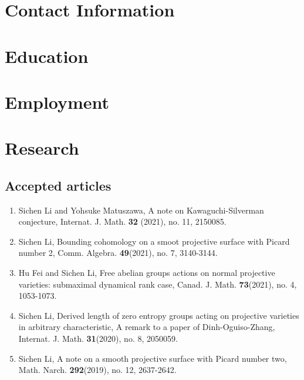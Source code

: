 \documentclass{resume}
\begin{document}

\section{\bf Contact Information}
\section{\bf Education}
\section{\bf Employment}
\section{\bf Research}
\subsection{\bf Accepted articles}
\begin{enumerate}
\item  Sichen Li and  Yohsuke Matuszawa, A note on Kawaguchi-Silverman conjecture, Internat. J. Math. \textbf{32} (2021), no. 11, 2150085.
\item Sichen Li, Bounding cohomology on a smoot projective surface with Picard number 2, Comm. Algebra. \textbf{49}(2021), no. 7, 3140-3144.
\item Hu Fei and Sichen Li, Free abelian groups actions on normal projective varieties: submaximal dynamical rank case, Canad. J. Math. \textbf{73}(2021), no. 4, 1053-1073. 
\item  Sichen Li, Derived length of zero entropy groups acting on projective varieties in arbitrary characteristic, A remark to a paper of Dinh-Oguiso-Zhang, Internat. J. Math. \textbf{31}(2020), no. 8, 2050059. 
\item Sichen Li, A note on a smooth projective surface with Picard number two, Math. Narch. \textbf{292}(2019), no. 12, 2637-2642. 
\end{enumerate}
\end{document}
